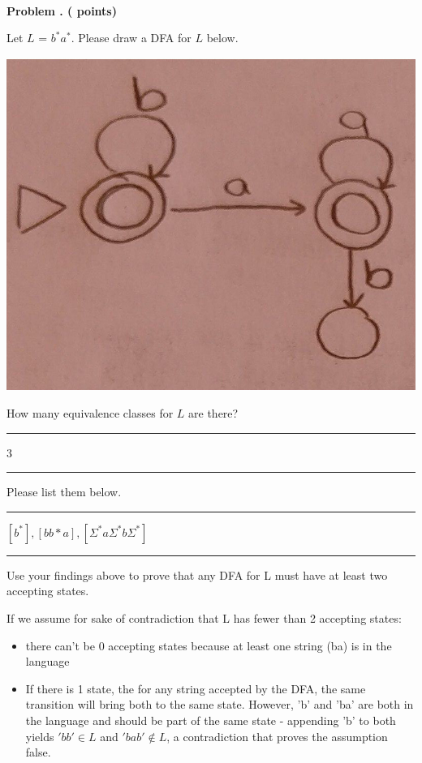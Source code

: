 \
\newpage
\addtocounter{problemctr}{1}
\noindent
{\bf
Problem \theproblemctr.  (\thedfastates \xspace points)}
\swallow{ (\thedfastatestime\xspace minutes)}

\smallskip

\noindent Let $L$ = $b^*a^*$. Please draw a DFA for $L$ below.

\vspace*{6em}
\includegraphics[scale=0.25]{dfa.jpg}
\vspace*{6em}


\noindent How many equivalence classes for $L$ are there?
\rule{1cm}{.01in}3\rule{1cm}{.01in}

\bigskip

\noindent
Please list them below.

\bigskip


\rule{2cm}{.01in}$[b^*],[bb*a],[\Sigma^*a\Sigma^*b\Sigma^*]$\rule{2cm}{.01in}

\bigskip

\noindent Use your findings above to prove that any DFA for L must have at least two
accepting states.


If we assume for sake of contradiction that L has fewer than 2 accepting states:
\begin{itemize}
    \item there can't be 0 accepting states because at least one string (ba) is in the language
    \item If there is 1 state, the for any string accepted by the DFA, the same transition will bring both to the same state. However, 'b' and 'ba' are both in the language and should be part of the same state - appending 'b' to both yields $'bb'\in L$ and $'bab'\not\in L$, a contradiction that proves the assumption false.
\end{itemize}